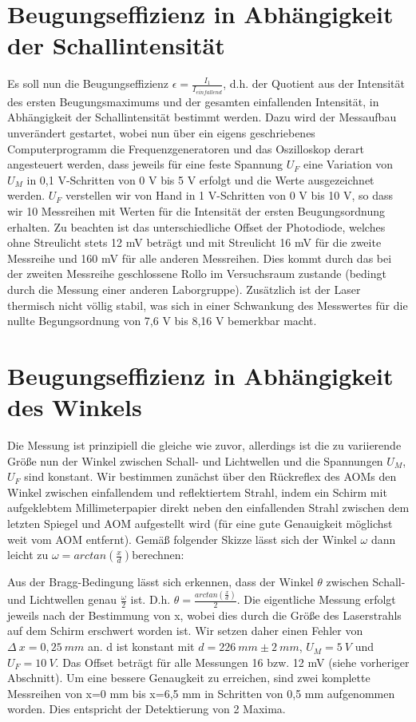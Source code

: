 \documentclass[bigchapter,colorback,accentcolor=tud4b,linedtoc,11pt]{tudreport}
\begin{document}
\section{Beugungseffizienz in Abhängigkeit der Schallintensität}

Es soll nun die Beugungseffizienz $\epsilon = \frac{I_1}{I_{einfallend}}$, d.h. der Quotient aus der Intensität des ersten Beugungsmaximums und der gesamten einfallenden Intensität, in Abhängigkeit der Schallintensität bestimmt werden. Dazu wird der Messaufbau unverändert gestartet, wobei nun über ein eigens geschriebenes Computerprogramm die Frequenzgeneratoren und das Oszilloskop derart angesteuert werden, dass jeweils für eine feste Spannung $U_F$ eine Variation von $U_M$ in 0,1 V-Schritten von 0 V bis 5 V erfolgt und die Werte ausgezeichnet werden. $U_F$ verstellen wir von Hand in 1 V-Schritten von 0 V bis 10 V, so dass wir 10 Messreihen mit Werten für die Intensität der ersten Beugungsordnung erhalten. Zu beachten ist das unterschiedliche Offset der Photodiode, welches ohne Streulicht stets 12 mV beträgt und mit Streulicht 16 mV für die zweite Messreihe und 160 mV für alle anderen Messreihen. Dies kommt durch das bei der zweiten Messreihe geschlossene Rollo im Versuchsraum zustande (bedingt durch die Messung einer anderen Laborgruppe). Zusätzlich ist der Laser thermisch nicht völlig stabil, was sich in einer Schwankung des Messwertes für die nullte Begungsordnung von 7,6 V bis 8,16 V bemerkbar macht.

\section{Beugungseffizienz in Abhängigkeit des Winkels}

Die Messung ist prinzipiell die gleiche wie zuvor, allerdings ist die zu variierende Größe nun der Winkel zwischen Schall- und Lichtwellen und die Spannungen $U_M$, $U_F$ sind konstant. Wir bestimmen zunächst über den Rückreflex des AOMs den Winkel zwischen einfallendem und reflektiertem Strahl, indem ein Schirm mit aufgeklebtem Millimeterpapier direkt neben den einfallenden Strahl zwischen dem letzten Spiegel und AOM aufgestellt wird (für eine gute Genauigkeit möglichst weit vom AOM entfernt). Gemäß folgender Skizze lässt sich der Winkel $\omega$ dann leicht zu $\omega = arc tan (\frac{x}{d})$berechnen: 

Aus der Bragg-Bedingung lässt sich erkennen, dass der Winkel $\theta$ zwischen Schall- und Lichtwellen genau $\frac{\omega}{2}$ ist. D.h. $\theta = \frac{arc tan (\frac{x}{d})}{2}$. Die eigentliche Messung erfolgt jeweils nach der Bestimmung von x, wobei dies durch die Größe des Laserstrahls auf dem Schirm erschwert worden ist. Wir setzen daher einen Fehler von $\Delta~x = 0,25~mm$ an. d ist konstant mit $d = 226~mm \pm 2~mm$, $U_M = 5~V$ und $U_F = 10~V$. Das Offset beträgt für alle Messungen 16 bzw. 12 mV (siehe vorheriger Abschnitt). Um eine bessere Genaugkeit zu erreichen, sind zwei komplette Messreihen von x=0 mm bis x=6,5 mm in Schritten von 0,5 mm aufgenommen worden. Dies entspricht der Detektierung von 2 Maxima.
\end{document}
